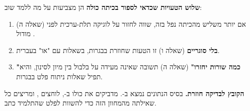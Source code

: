 \documentclass[11pt,a4paper]{article}
\begin{document}
\vspace{10pt}
\begin{panel}
\textbf{שלוש הטעויות שכדאי לספור בכיתה כולה} \textendash{} הן מצביעות על מה ללמד שוב:

\vspace{3pt}
\begin{enumerate}[leftmargin=1.5em, itemsep=3pt, topsep=2pt]
  \item \textbf{} (שאלה ה) \textendash{} אם יותר משליש מהכיתה נפל בזה, שווה לחזור על לוגיקה תלת-ערכית לפני מודול .
  \item \textbf{ בלי סוגריים} (שאלה ו) \textendash{} זו הטעות שחוזרת בבגרות, בשאלות עם "או" בעברית.
  \item \textbf{"כמה שורות יחזרו"} (שאלה ה) \textendash{} תשובה שאינה  מעידה על בלבול בין מיון לסינון, והיא תפיל שאלות ניתוח פלט בבגרות.
\end{enumerate}
\end{panel}

\vspace{6pt}
\begin{panel}
\textbf{הקובץ לבדיקה חוזרת.} בסיס הנתונים נמצא ב-. מדביקים את כולו ב-, לוחצים , ומריצים כל שאילתה מהמחוון הזה כדי להשוות לפלט שהתלמיד כתב.
\end{panel}
\end{document}
